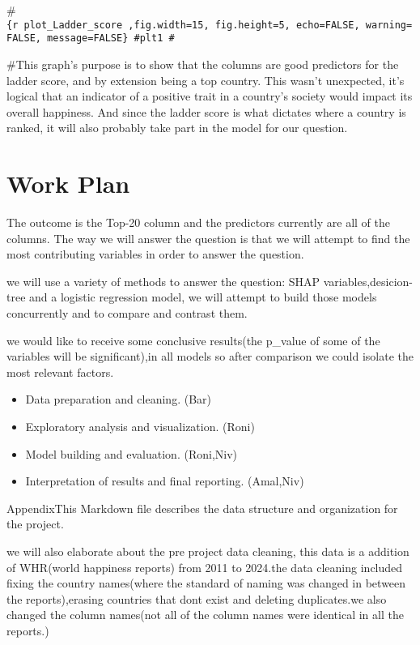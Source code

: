 \documentclass[
]{article}
\providecommand{\tightlist}{%
  \setlength{\itemsep}{0pt}\setlength{\parskip}{0pt}}
\begin{document}
\#\texttt{\{r\ plot\_Ladder\_score\ ,fig.width=15,\ fig.height=5,\ echo=FALSE,\ warning=FALSE,\ message=FALSE\}\ \#plt1\ \#}

\#This graph's purpose is to show that the columns are good predictors
for the ladder score, and by extension being a top country. This wasn't
unexpected, it's logical that an indicator of a positive trait in a
country's society would impact its overall happiness. And since the
ladder score is what dictates where a country is ranked, it will also
probably take part in the model for our question.

\section{Work Plan}\label{work-plan}

The outcome is the Top-20 column and the predictors currently are all of
the columns. The way we will answer the question is that we will attempt
to find the most contributing variables in order to answer the question.

we will use a variety of methods to answer the question: SHAP
variables,desicion-tree and a logistic regression model, we will attempt
to build those models concurrently and to compare and contrast them.

we would like to receive some conclusive results(the p\_value of some of
the variables will be significant),in all models so after comparison we
could isolate the most relevant factors.

\begin{itemize}
\tightlist
\item
  Data preparation and cleaning. (Bar)
\item
  Exploratory analysis and visualization. (Roni)
\item
  Model building and evaluation. (Roni,Niv)
\item
  Interpretation of results and final reporting. (Amal,Niv)
\end{itemize}

\newpage

Appendix\newline   This Markdown file describes the data structure and
organization for the project.\newline  

we will also elaborate about the pre project data cleaning,\newline  
this data is a addition of WHR(world happiness reports) from 2011 to
2024.\newline   the data cleaning included fixing the country
names(where the standard of naming was changed in between the
reports),erasing countries that dont exist and deleting
duplicates.\newline   we also changed the column names(not all of the
column names were identical in all the reports.)\newline  
\end{document}

